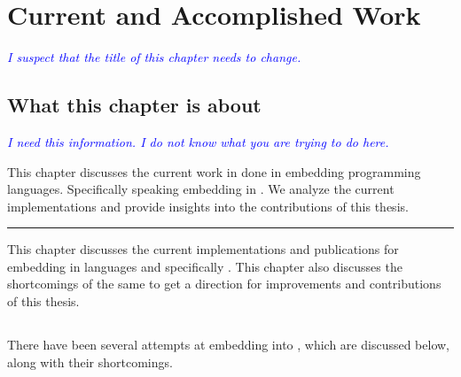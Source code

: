 \documentclass[thesis-solanki.tex]{subfiles}
\begin{document}
\chapter{Current and Accomplished Work}\label{chap:proposedWork}

\textcolor{blue}{\textsl{I suspect that the title of this chapter needs to change.}}

\section{What this chapter is about}\label{sec:what-this-chapter:proposedWork}

\textcolor{blue}{\textsl{I need this information.
    I do not know what you are trying to do here.
}}

This chapter discusses the current work in done in embedding programming languages.
Specifically speaking embedding  in .
We analyze the current implementations and provide insights into the contributions of this thesis.

\noindent\rule{\textwidth}{0.5pt}

This chapter discusses the current implementations and publications for embedding  in languages and specifically 
. This chapter also discusses the shortcomings of the same to get a direction for improvements and contributions of this 
thesis. 

\section{} \label{sec:existing-work-by-others}

There have been several attempts at embedding  into , which are
discussed below, along with their shortcomings.
\end{document}
